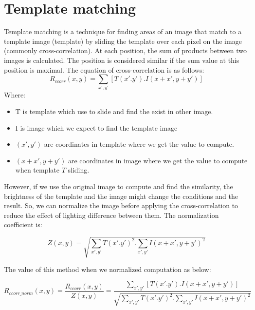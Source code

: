 \section{Template matching}\label{template}
Template matching is a technique for finding areas of an image that match to a template image (template) by sliding the template over each pixel on the image (commonly cross-correlation). At each position, the sum of products between two images is calculated. The position is considered similar if the sum value at this position is maximal. The equation of cross-correlation is as follows:
\begin{equation}
\label{eq:cross-correlation}
	R_{ccorr}(x,y) = \sum\limits_{x',y'}[T(x'.y').I(x + x', y + y')]
\end{equation}
Where:
\begin{itemize}
\item T is template which use to slide and find the exist in other image.
\item I is image which we expect to find the template image
\item $(x', y')$ are coordinates in template where we get the value to compute.
\item $(x + x', y + y')$ are coordinates in image where we get the value to compute when template $T$ sliding.
\end{itemize}
However, if we use the original image to compute and find the similarity, the brightness of the template and the image might change the conditions and the result. So, we can normalize the image before applying the cross-correlation to reduce the effect of lighting difference between them. The normalization coefficient is:
\begin{center}
\begin{equation}\label{eq:normalizeCoff}
Z(x,y) = \sqrt{\sum\limits_{x',y'}T(x'.y')^{2}.\sum\limits_{x',y'}I(x + x', y + y')^{2}}
\end{equation}
\end{center}
The value of this method when we normalized computation as below:
\begin{center}
\begin{equation}\label{eq:cross-correlation}
R_{ccorr\_norm}(x,y) =\frac{R_{ccorr}(x,y)}{Z(x,y)} = \frac{\sum\limits_{x',y'}[T(x'.y').I(x + x', y + y')]}{\sqrt{\sum\limits_{x',y'}T(x'.y')^{2}.\sum\limits_{x',y'}I(x + x', y + y')^{2}}}
\end{equation}
\end{center}
